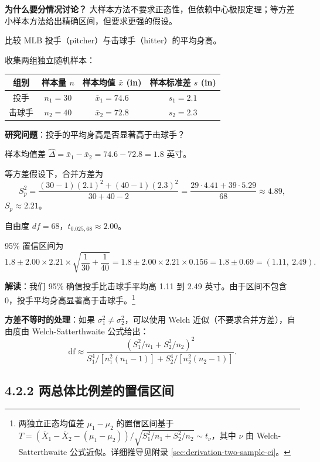 \textbf{为什么要分情况讨论？} 大样本方法不要求正态性，但依赖中心极限定理；等方差小样本方法给出精确区间，但要求更强的假设。

\begin{example}[棒球运动员身高差]\label{ex:two-sample-baseball}
比较 MLB 投手（pitcher）与击球手（hitter）的平均身高。

收集两组独立随机样本：
\begin{center}
\begin{tabular}{c|c|c|c}
\hline
组别 & 样本量 $n$ & 样本均值 $\bar{x}$ (in) & 样本标准差 $s$ (in) \\ \hline
投手 & $n_1=30$ & $\bar{x}_1=74.6$ & $s_1=2.1$ \\
击球手 & $n_2=40$ & $\bar{x}_2=72.8$ & $s_2=2.3$ \\ \hline
\end{tabular}
\end{center}

\textbf{研究问题}：投手的平均身高是否显著高于击球手？

样本均值差 $\widehat{\Delta} = \bar{x}_1 - \bar{x}_2 = 74.6 - 72.8 = 1.8$ 英寸。

等方差假设下，合并方差为
\[
S_p^2 = \frac{(30-1)(2.1)^2 + (40-1)(2.3)^2}{30+40-2} = \frac{29\cdot4.41 + 39\cdot5.29}{68} \approx 4.89,
\]
$S_p \approx 2.21$。

自由度 $df = 68$，$t_{0.025,68} \approx 2.00$。

95\% 置信区间为
\[
1.8 \pm 2.00 \times 2.21 \times \sqrt{\frac{1}{30}+\frac{1}{40}}
= 1.8 \pm 2.00 \times 2.21 \times 0.156
= 1.8 \pm 0.69
= (1.11,\ 2.49).
\]

\textbf{解读}：我们 95\% 确信投手比击球手平均高 1.11 到 2.49 英寸。由于区间不包含 0，投手平均身高显著高于击球手。\footnote{两独立正态均值差 $\mu_1-\mu_2$ 的置信区间基于 $T = (\bar{X}_1-\bar{X}_2-(\mu_1-\mu_2))/\sqrt{S_1^2/n_1+S_2^2/n_2} \sim t_\nu$，其中 $\nu$ 由 Welch-Satterthwaite 公式近似。详细推导见附录 \cref{sec:derivation-two-sample-ci}。}
\end{example}

\textbf{方差不等时的处理}：如果 $\sigma_1^2 \neq \sigma_2^2$，可以使用 Welch 近似（不要求合并方差），自由度由 Welch-Satterthwaite 公式给出：
\[
\mathrm{df} \approx \frac{\left(S_1^2/n_1 + S_2^2/n_2\right)^2}
{S_1^4/[n_1^2(n_1-1)] + S_2^4/[n_2^2(n_2-1)]}.
\label{eq:welch-satterthwaite}
\]

\subsection{4.2.2 两总体比例差的置信区间}\label{sec:4.2.2}

